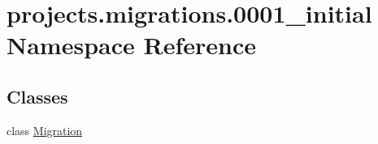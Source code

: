 \hypertarget{namespaceprojects_1_1migrations_1_10001__initial}{\section{projects.\-migrations.0001\-\_\-initial Namespace Reference}
\label{namespaceprojects_1_1migrations_1_10001__initial}
}
\subsection*{Classes}
\begin{DoxyCompactItemize}
\item 
class \hyperlink{classprojects_1_1migrations_1_10001__initial_1_1_migration}{Migration}
\end{DoxyCompactItemize}
